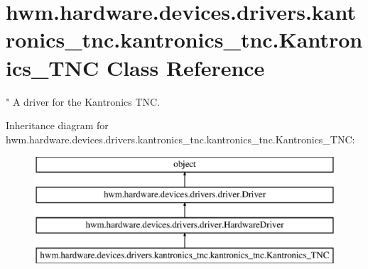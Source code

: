 \hypertarget{classhwm_1_1hardware_1_1devices_1_1drivers_1_1kantronics__tnc_1_1kantronics__tnc_1_1_kantronics___t_n_c}{\section{hwm.\-hardware.\-devices.\-drivers.\-kantronics\-\_\-tnc.\-kantronics\-\_\-tnc.\-Kantronics\-\_\-\-T\-N\-C Class Reference}
\label{classhwm_1_1hardware_1_1devices_1_1drivers_1_1kantronics__tnc_1_1kantronics__tnc_1_1_kantronics___t_n_c}
}


" A driver for the Kantronics T\-N\-C.  


Inheritance diagram for hwm.\-hardware.\-devices.\-drivers.\-kantronics\-\_\-tnc.\-kantronics\-\_\-tnc.\-Kantronics\-\_\-\-T\-N\-C\-:\begin{figure}[H]
\begin{center}
\leavevmode
\includegraphics[height=4.000000cm]{classhwm_1_1hardware_1_1devices_1_1drivers_1_1kantronics__tnc_1_1kantronics__tnc_1_1_kantronics___t_n_c}
\end{center}
\end{figure}
